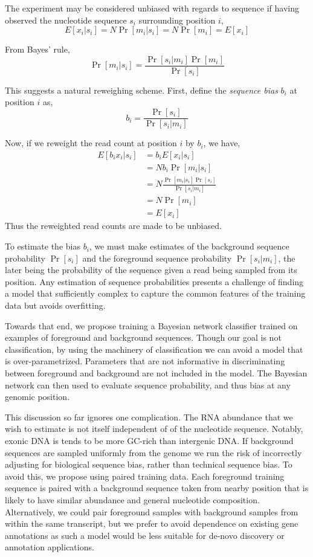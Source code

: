 \documentclass{bioinfo}
\begin{document}
The experiment may be considered unbiased  with regards to sequence if having
observed the nucleotide sequence $s_i$ surrounding position $i$,
$$ E[ x_i | s_i ] = N \Pr[ m_i | s_i ] = N \Pr[ m_i ] = E[ x_i ] $$

From Bayes' rule,
$$ \Pr[ m_i | s_i ] = \frac{ \Pr[ s_i | m_i ] \Pr[ m_i ] }{ \Pr[ s_i ] } $$

This suggests a natural reweighing scheme. First, define the \emph{sequence
bias} $b_i$ at position $i$ as,
$$ b_i = \frac{ \Pr[ s_i ] } { \Pr[ s_i | m_i ] } $$

Now, if we reweight the read count at position $i$ by $b_i$, we
have,
\begin{align*}
E[ b_i x_i  | s_i ] &= b_i E[ x_i | s_i ] \\
&= N b_i \Pr[ m_i | s_i ] \\
&= N \frac{ \Pr[ m_i | s_i ] \Pr[ s_i ] }{ \Pr[ s_i | m_i ] } \\
&= N \Pr[ m_i ] \\
&= E[ x_i ]
\end{align*}
Thus the reweighted read counts are made to be unbiased.


To estimate the bias $b_i$, we must make estimates of the background sequence
probability $\Pr[s_i]$ and the foreground sequence probability $\Pr[ s_i | m_i
]$, the later being the probability of the sequence given a read being sampled
from its position. Any estimation of sequence probabilities presents a challenge
of finding a model that sufficiently complex to capture the common features of
the training data but avoids overfitting.

Towards that end, we propose training a Bayesian network classifier trained on
examples of foreground and background sequences. Though our goal is not
classification, by using the machinery of classification we can avoid a model
that is over-parametrized. Parameters that are not informative in
discriminating between foreground and background are not included in the model.
The Bayesian network can then used to evaluate sequence probability, and thus
bias at any genomic position.

This discussion so far ignores one complication. The RNA abundance that we wish to
estimate is not itself independent of of the nucleotide sequence. Notably,
exonic DNA is tends to be more GC-rich than intergenic DNA. If background
sequences are sampled uniformly from the genome we run the risk of incorrectly
adjusting for biological sequence bias, rather than technical sequence bias. To
avoid this, we propose using paired training data. Each foreground training
sequence is paired with a background sequence taken from nearby position that is
likely to have similar abundance and general nucleotide composition.
Alternatively, we could pair foreground samples with background samples from
within the same transcript, but we prefer to avoid dependence on existing gene
annotations as such a model would be less suitable for de-novo discovery or
annotation applications.
\end{document}
